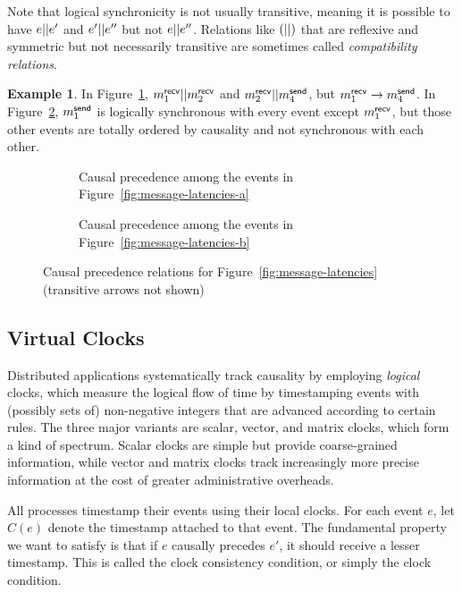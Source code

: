 \documentclass[]             %
{NASA}                       %
\theoremstyle{definition}
\newtheorem{example}[theorem]{Example}
\begin{document}
Note that logical synchronicity is not usually transitive, meaning it
is possible to have $e || e'$ and $e' || e''$ but not
$e || e''$.  Relations like $\left(||\right)$ that are
reflexive and symmetric but not necessarily transitive are sometimes
called \emph{compatibility relations}.
\begin{example}
  \label{ex:synchronous-intransitive}
  In Figure~\ref{fig:message-co-a}, $m_{1}^{\mathsf{recv}} || m_{2}^{\mathsf{recv}}$ and
  $m_{2}^{\mathsf{recv}} || m_{4}^{\mathsf{send}}$, but $m_{1}^{\mathsf{recv}} \to m_{4}^{\mathsf{send}}$. In
  Figure~\ref{fig:message-co-b}, $m_{1}^{\mathsf{send}}$ is logically synchronous
  with every event except $m_{1}^{\mathsf{recv}}$, but those other events are
  totally ordered by causality and not synchronous with each other.
\end{example}

\begin{figure}
  \begingroup
  \setlength\belowcaptionskip{4ex}
  \begin{subfigure}{1\textwidth}
    \centering
    
    \caption{Causal precedence among the events in Figure~\ref{fig:message-latencies-a}}
    \label{fig:message-co-a}
  \end{subfigure}
  \endgroup
  \begin{subfigure}{1\textwidth}
    \centering
    
    \caption{Causal precedence among the events in Figure~\ref{fig:message-latencies-b}}
    \label{fig:message-co-b}
  \end{subfigure}
  \caption{Causal precedence relations for Figure~\ref{fig:message-latencies} (transitive arrows not shown)}
  \label{fig:causal-precedence}
\end{figure}

\subsection{Virtual Clocks}
\label{ssec:timestamps}
Distributed applications systematically track causality by employing
\emph{logical} clocks, which measure the logical flow of time by
timestamping events with (possibly sets of) non-negative integers that
are advanced according to certain rules. The three major variants are
scalar, vector, and matrix clocks, which form a kind of
spectrum. Scalar clocks are simple but provide coarse-grained
information, while vector and matrix clocks track increasingly more
precise information at the cost of greater administrative overheads.

All processes timestamp their events using their local clocks. For
each event $e$, let $C(e)$ denote the timestamp attached to that
event. The fundamental property we want to satisfy is that if $e$
causally precedes $e'$, it should receive a lesser timestamp. This is
called the clock consistency condition, or simply the clock condition.
\end{document}
